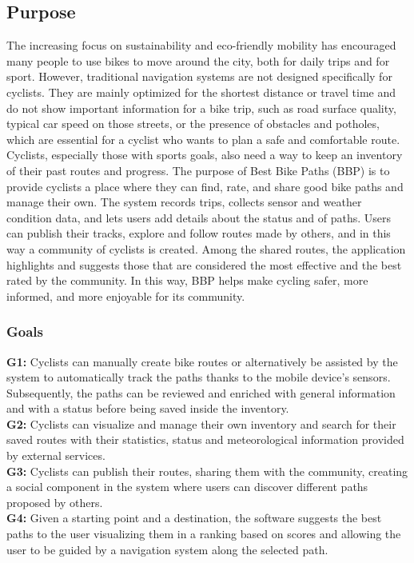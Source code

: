 \subsection{Purpose}
The increasing focus on sustainability and eco-friendly mobility has encouraged many people to use bikes to move around the city, both for daily trips and for sport.
However, traditional navigation systems are not designed specifically for cyclists. They are mainly optimized for the shortest distance or travel time and do not show important information for a bike trip, such as road surface quality, typical car speed on those streets, or the presence of obstacles and potholes, which are essential for a cyclist who wants to plan a safe and comfortable route. Cyclists, especially those with sports goals, also need a way to keep an inventory of their past routes and progress.
The purpose of Best Bike Paths (BBP) is to provide cyclists a place where they can find, rate, and share good bike paths and manage their own. 
The system records trips, collects sensor and weather condition data, and lets users add details about the status and of paths. Users can publish their tracks, explore and follow routes made by others, and in this way a community of cyclists is created. Among the shared routes, the application highlights and suggests those that are considered the most effective and the best rated by the community. In this way, BBP helps make cycling safer, more informed, and more enjoyable for its community.
\subsubsection{Goals}
\textbf{G1:} Cyclists can manually create bike routes or alternatively be assisted by the system to automatically track the paths thanks to the mobile device's sensors. Subsequently, the paths can be reviewed and enriched with general information and with a status before being saved inside the inventory. \\ [2mm]
\textbf{G2:} Cyclists can visualize and manage their own inventory and search for their saved routes with their statistics, status and meteorological information provided by external services. \\ [2mm] 
\textbf{G3:} Cyclists can publish their routes, sharing them with the community, creating a social component in the system where users can discover different paths proposed by others. \\ [2mm]
\textbf{G4:} Given a starting point and a destination, the software suggests the best paths to the user visualizing them in a ranking based on scores and allowing the user to be guided by a navigation system along the selected path. 

